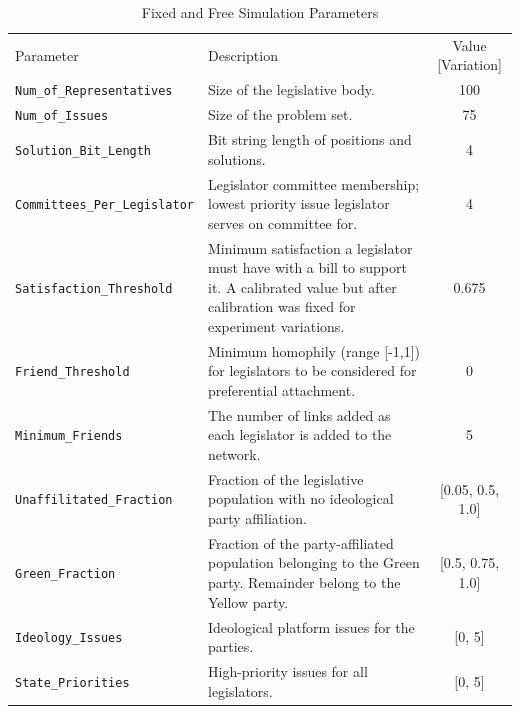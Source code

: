 \documentclass[pdftex,12pt]{llncs}
\begin{document}
\begin{table}
 \caption{Fixed and Free Simulation Parameters}
 \begin{tabular}{lp{3.75in}c}
 \hline\noalign{\smallskip}
 Parameter & Description & Value [Variation] \\
 \noalign{\smallskip}
 \hline
 \noalign{\smallskip}
 \texttt{Num\_of\_Representatives} & Size of the legislative body. & 100 \\
 \texttt{Num\_of\_Issues} & Size of the problem set. & 75 \\
 \texttt{Solution\_Bit\_Length} & Bit string length of positions and solutions. & 4 \\
 \texttt{Committees\_Per\_Legislator} & Legislator committee membership; lowest priority issue legislator serves on committee for. & 4 \\
 \texttt{Satisfaction\_Threshold} & Minimum satisfaction a legislator must have with a bill to support it.  A calibrated value but after calibration was fixed for experiment variations. & 0.675 \\
 \texttt{Friend\_Threshold} & Minimum homophily (range [-1,1]) for legislators to be considered for preferential attachment. & 0 \\
 \texttt{Minimum\_Friends} & The number of links added as each legislator is added to the network. & 5 \\
 \texttt{Unaffilitated\_Fraction} & Fraction of the legislative population with no ideological party  affiliation. & [0.05, 0.5, 1.0] \\
 \texttt{Green\_Fraction} & Fraction of the party-affiliated population belonging to the Green party. Remainder belong to the Yellow party. & [0.5, 0.75, 1.0] \\
 \texttt{Ideology\_Issues} & Ideological platform issues for the parties. & [0, 5] \\
 \texttt{State\_Priorities} & High-priority issues for all legislators. & [0, 5] \\
 \hline
 \end{tabular}
 \label{params}
\end{table}
\end{document}
